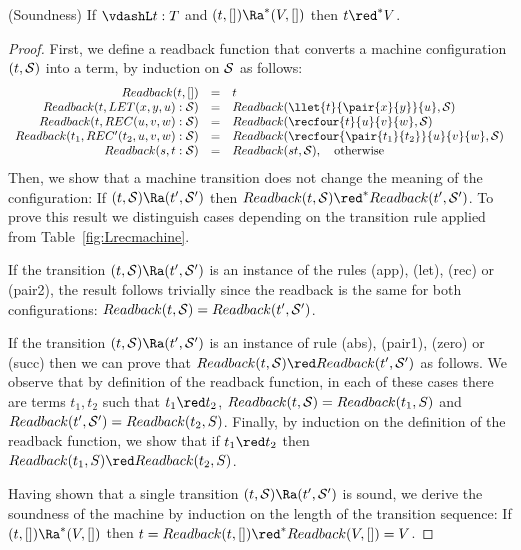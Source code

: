 \documentclass{article}
\begin{document}
\begin{theorem}(Soundness)
If $\vdashL t:T$ and  $(t,[]) \Ra^*(V,[])$ then $t \red^* V$.
\end{theorem}
\begin{proof}
First, we define a readback function 
that converts a machine configuration $(t,{\cal S})$
into a term, by induction on ${\cal S}$ as follows:
\[\begin{array}{rcl}
Readback(t,[]) & = & t\\
Readback(t,LET(x,y,u):{\cal S}) & = & 
Readback(\llet{t}{\pair{x}{y}}{u},{\cal S})\\
Readback(t,REC(u,v,w):{\cal S}) & = & 
Readback(\recfour{t}{u}{v}{w},{\cal S})\\
Readback(t_1,REC'(t_2,u,v,w):{\cal S}) & = &  
Readback(\recfour{\pair{t_1}{t_2}}{u}{v}{w},{\cal S}) \\
Readback(s,t:{\cal S})& = &  Readback(st,{\cal S}), ~~~\mbox{otherwise}
\end{array}
\]
Then, we show that 
a machine transition does not change the meaning of
the configuration:
If $(t,{\cal S}) \Ra (t',{\cal S}')$ then 
$Readback(t,{\cal S}) \red^* Readback(t',{\cal S}')$.
To prove this result we distinguish cases depending on the transition rule applied from Table~\ref{fig:Lrecmachine}.




If the transition $(t,{\cal S}) \Ra (t',{\cal S}')$ is an instance of the rules (app), (let), (rec) or (pair2), the result follows trivially since the readback is the same for both configurations: $Readback(t,{\cal S}) = Readback(t',{\cal S}')$.  

If  the transition $(t,{\cal S}) \Ra (t',{\cal S}')$ is an instance of rule (abs), (pair1), (zero) or (succ) then  we can prove that $Readback(t,{\cal S}) \red Readback(t',{\cal S}')$ as follows. We observe that by definition of the readback function, in each of these cases there are terms $t_1,t_2$  such that $t_1 \red t_2$,  $Readback(t,{\cal S})= Readback (t_1,S)$ and $Readback(t',{\cal S}')= Readback (t_2,S)$. Finally, by induction on the definition of the readback function, we show that if $t_1 \red t_2$ then $ Readback (t_1,S) \red Readback (t_2,S)$.

Having shown that a single transition $(t,{\cal S}) \Ra (t',{\cal S}')$ is sound, we derive the soundness of the machine by induction on the length of the transition sequence: If $(t,[]) \Ra^* (V,[])$ then 
$t = Readback(t,[]) \red^* Readback(V,[]) = V$.
\end{proof}
\end{document}
